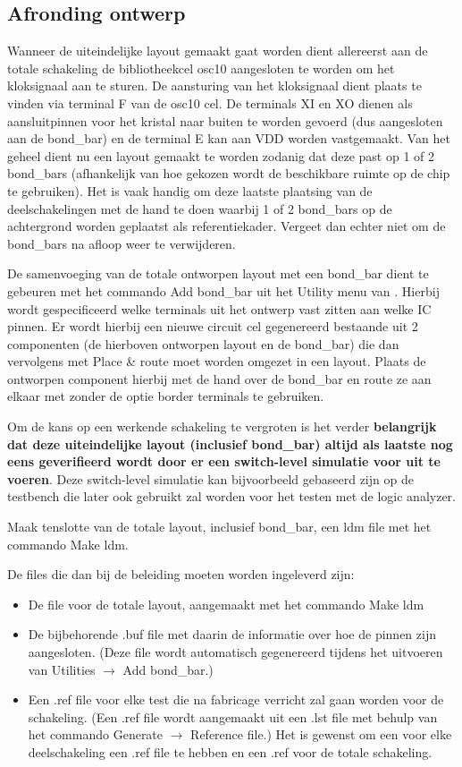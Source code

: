 

\subsection{Afronding ontwerp}
Wanneer de uiteindelijke layout gemaakt gaat worden
dient allereerst aan de totale schakeling de bibliotheekcel osc10 aangesloten
te worden om het kloksignaal aan te sturen.
De aansturing van het kloksignaal dient plaats te vinden via terminal F van de osc10 cel.
De terminals XI en XO dienen als aansluitpinnen
voor het kristal naar buiten te worden gevoerd 
(dus aangesloten aan de bond\_bar) 
en de terminal E kan aan VDD worden vastgemaakt.
Van het geheel dient nu een layout gemaakt te worden zodanig dat
deze past op 1 of 2 bond\_bars (afhankelijk van hoe gekozen wordt de
beschikbare ruimte op de chip te gebruiken).
Het is vaak handig om deze laatste plaatsing van de deelschakelingen met de hand
te doen waarbij 1 of 2 bond\_bars op de achtergrond worden geplaatst als
referentiekader.
Vergeet dan echter niet om de bond\_bars na afloop weer te verwijderen.

De samenvoeging van de totale ontworpen layout met een bond\_bar dient te
gebeuren met het commando Add bond\_bar uit het Utility menu van .
Hierbij wordt gespecificeerd welke
terminals uit het ontwerp vast zitten aan welke IC pinnen.
Er wordt hierbij een nieuwe circuit cel gegenereerd bestaande uit 2 componenten
(de hierboven ontworpen layout en de bond\_bar) die dan vervolgens met 
Place \& route moet worden omgezet in een layout.
Plaats de ontworpen component hierbij met de hand over de bond\_bar
en route ze aan elkaar met  zonder de optie border terminals te gebruiken.

Om de kans op een werkende schakeling te vergroten is het
verder {\bf belangrijk
dat deze uiteindelijke layout (inclusief bond\_bar)
altijd als laatste nog eens geverifieerd wordt door er een switch-level
simulatie voor uit te voeren}.
Deze switch-level simulatie kan bijvoorbeeld gebaseerd zijn op de testbench
die later ook gebruikt zal worden voor het testen met de logic analyzer.

Maak tenslotte van de totale layout, inclusief bond\_bar, een ldm file
met het commando Make ldm.

De files die dan bij de beleiding moeten worden ingeleverd zijn:
\begin{itemize}
\item
De  file voor de totale layout,
aangemaakt met het commando Make ldm
\item
De bijbehorende .buf file
met daarin de informatie over hoe de pinnen zijn aangesloten.
(Deze file wordt automatisch gegenereerd
tijdens het uitvoeren van Utilities $\rightarrow$ Add bond\_bar.)
\item
Een .ref file voor elke test die na fabricage verricht zal
gaan worden voor de schakeling.
(Een .ref file
wordt aangemaakt uit een .lst file met behulp van
het commando Generate $\rightarrow$ Reference file.)
Het is gewenst om een voor elke deelschakeling een .ref file 
te hebben en een .ref voor de totale schakeling.
\end{itemize}
\cleardoublepage

